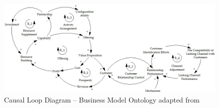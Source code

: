 \begin{figure}[tb]
	\centering
	\includegraphics[width=\textwidth]{gfx/cld_kiani}
	\caption[Causal Loop Diagram -- Business Model Ontology]{Causal Loop Diagram -- Business Model Ontology adapted from \citet[p. 164]{Kiani2009}}
	\label{fig:cld_ki}
\end{figure}

